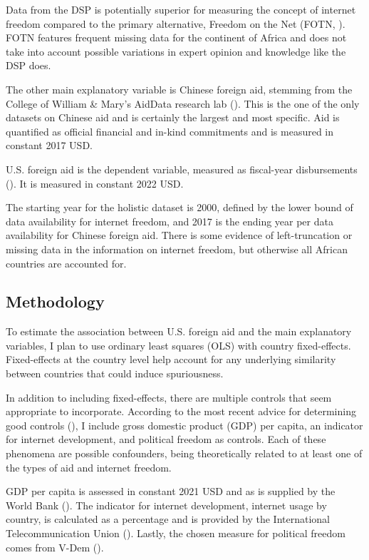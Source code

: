 Data from the DSP is potentially superior for measuring the concept of internet freedom compared to the primary alternative, Freedom on the Net (FOTN, \cite{house2022}). FOTN features frequent missing data for the continent of Africa and does not take into account possible variations in expert opinion and knowledge like the DSP does.

The other main explanatory variable is Chinese foreign aid, stemming from the College of William \& Mary's AidData research lab (\cite{custer2021}). This is the one of the only datasets on Chinese aid and is certainly the largest and most specific. Aid is quantified as official financial and in-kind commitments and is measured in constant 2017 USD.

U.S. foreign aid is the dependent variable, measured as fiscal-year disbursements (\cite{government2022e}). It is measured in constant 2022 USD.

The starting year for the holistic dataset is 2000, defined by the lower bound of data availability for internet freedom, and 2017 is the ending year per data availability for Chinese foreign aid. There is some evidence of left-truncation or missing data in the information on internet freedom, but otherwise all African countries are accounted for.

\subsection*{Methodology}
To estimate the association between U.S. foreign aid and the main explanatory variables, I plan to use ordinary least squares (OLS) with country fixed-effects. Fixed-effects at the country level help account for any underlying similarity between countries that could induce spuriousness.

In addition to including fixed-effects, there are multiple controls that seem appropriate to incorporate. According to the most recent advice for determining good controls (\cite{cinelli2022}), I include gross domestic product (GDP) per capita, an indicator for internet development, and political freedom as controls. Each of these phenomena are possible confounders, being theoretically related to at least one of the types of aid and internet freedom. 

GDP per capita is assessed in constant 2021 USD and as is supplied by the World Bank (\cite{bank2022}). The indicator for internet development, internet usage by country, is calculated as a percentage and is provided by the International Telecommunication Union (\cite{itu2022}). Lastly, the chosen measure for political freedom comes from V-Dem (\cite{coppedge2022a}).

